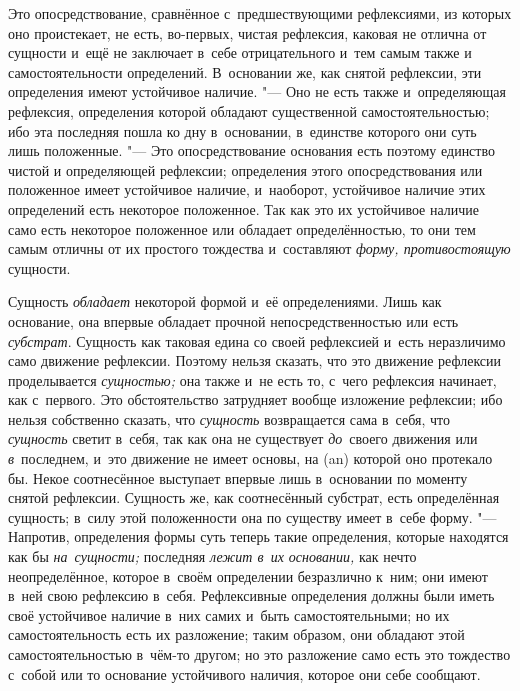 Это опосредствование, сравнённое с~предшествующими рефлексиями, из которых оно
проистекает, не есть, во-первых, чистая рефлексия, каковая не отлична от
сущности и~ещё не заключает в~себе отрицательного и~тем самым также и
самостоятельности определений. В~основании же, как снятой рефлексии, эти
определения имеют устойчивое наличие. "--- Оно не есть также и~определяющая
рефлексия, определения которой обладают существенной самостоятельностью; ибо
эта последняя пошла ко дну в~основании, в~единстве которого они суть лишь
положенные. "--- Это опосредствование основания есть поэтому единство чистой и
определяющей рефлексии; определения этого опосредствования или положенное имеет
устойчивое наличие, и~наоборот, устойчивое наличие этих определений есть
некоторое положенное. Так как это их устойчивое наличие само есть некоторое
положенное или обладает определённостью, то они тем самым отличны от их
простого тождества и~составляют {\em форму, противостоящую} сущности.

Сущность {\em обладает} некоторой формой и~её определениями. Лишь как
основание, она впервые обладает прочной непосредственностью или есть
{\em субстрат}. Сущность как таковая едина со своей рефлексией и~есть
неразличимо само движение рефлексии. Поэтому нельзя сказать, что это движение
рефлексии проделывается {\em сущностью;} она также и~не есть то, с~чего
рефлексия начинает, как с~первого. Это обстоятельство затрудняет вообще
изложение рефлексии; ибо нельзя собственно сказать, что {\em сущность}
возвращается сама в~себя, что {\em сущность} светит в~себя, так как она не
существует {\em до}~своего движения или {\em в}~последнем, и~это движение не
имеет основы, на (an) которой оно протекало бы. Некое соотнесённое выступает
впервые лишь в~основании по моменту снятой рефлексии. Сущность же, как
соотнесённый субстрат, есть определённая сущность; в~силу этой положенности она
по существу имеет в~себе форму. "--- Напротив, определения формы суть теперь
такие определения, которые находятся как бы {\em на~сущности;} последняя
{\em лежит в~их основании,} как нечто неопределённое, которое в~своём
определении безразлично к~ним; они имеют в~ней свою рефлексию в~себя.
Рефлексивные определения должны были иметь своё устойчивое наличие в~них самих
и~быть самостоятельными; но их самостоятельность есть их разложение; таким
образом, они обладают этой самостоятельностью в~чём-то другом; но это
разложение само есть это тождество с~собой или то основание устойчивого
наличия, которое они себе сообщают.

